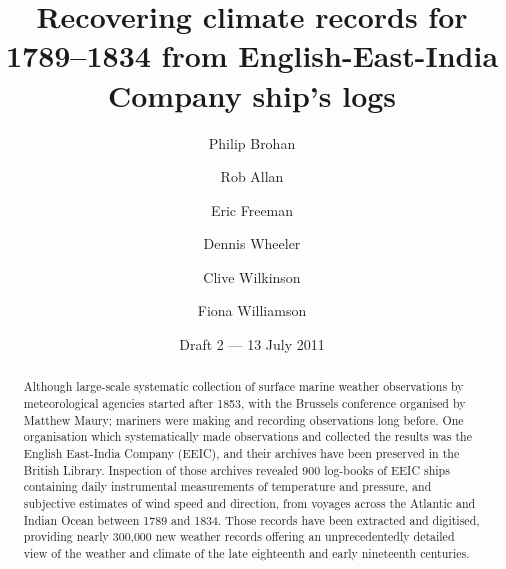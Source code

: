 \documentclass[CP]{copernicus}
\begin{document}
\title{Recovering climate records for 1789--1834 from English-East-India Company ship's logs}


\author[1]{Philip Brohan}
\author[1]{Rob Allan}
\author[2]{Eric Freeman}
\author[3]{Dennis Wheeler}
\author[4]{Clive Wilkinson}
\author[3,4]{Fiona Williamson}
\date{Draft 2 --- 13 July 2011}



\maketitle

\begin{abstract}

Although large-scale systematic collection of surface marine weather observations by meteorological agencies started after 1853, with the Brussels conference organised by Matthew Maury; mariners were making and recording observations long before. One organisation which systematically made observations and collected the results was the English East-India Company (EEIC), and their archives have been preserved in the British Library. Inspection of those archives revealed 900 log-books of EEIC ships containing daily instrumental measurements of temperature and pressure, and subjective estimates of wind speed and direction, from voyages across the Atlantic and Indian Ocean between 1789 and 1834. Those records have been extracted and digitised, providing nearly 300,000 new weather records offering an unprecedentedly detailed view of the weather and climate of the late eighteenth and early nineteenth centuries.
\end{abstract}

\introduction
\end{document}
